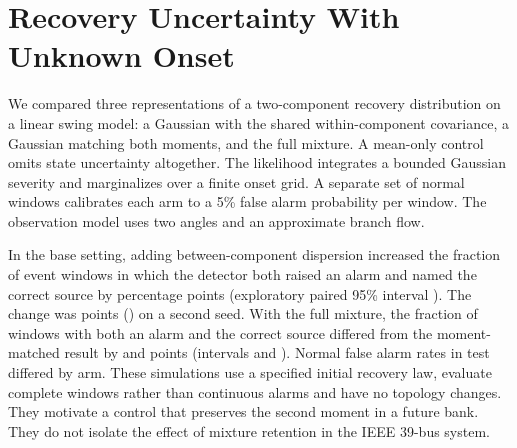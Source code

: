 \section{Recovery Uncertainty With Unknown Onset}
\label{app:unknown-onset-bridge}

We compared three representations of a two-component recovery distribution
on a linear swing model: a Gaussian with the shared within-component
covariance, a Gaussian matching both moments, and the full mixture.
A mean-only control omits state uncertainty altogether.
The likelihood integrates a bounded Gaussian severity and marginalizes
over a finite onset grid. A separate set of normal windows calibrates each
arm to a 5\% false alarm probability per window. The observation model
uses two angles and an approximate branch flow.

In the base setting, adding between-component dispersion increased
the fraction of event windows in which the detector both raised an alarm and named the correct source by \BridgeMomentOne{} percentage
points (exploratory paired 95\% interval \BridgeMomentOneCI{}).
The change was \BridgeMomentTwo{} points (\BridgeMomentTwoCI{}) on
a second seed. With the full mixture, the fraction of windows with both an alarm and the correct source differed from the moment-matched result by \BridgeMixtureOne{} and \BridgeMixtureTwo{}
points (intervals \BridgeMixtureOneCI{} and \BridgeMixtureTwoCI{}). Normal false alarm rates in test differed by arm.
These simulations use a specified initial recovery law, evaluate complete
windows rather than continuous alarms and have no topology changes.
They motivate a control that preserves the second moment in a future
bank. They do not isolate the effect of mixture retention in the
IEEE 39-bus system.\EOD
